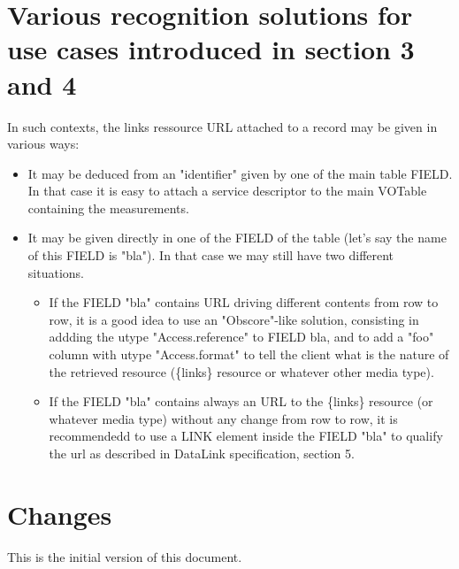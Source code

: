 \documentclass[11pt,a4paper]{ivoa}
\begin{document}
\section{Various recognition solutions for use cases introduced in section 3 and 4}
      In such contexts,  the links ressource URL attached to a record  may be given in various ways: 
\begin{itemize}
\item  It may be deduced from an "identifier" given by one of the main table FIELD. In that case it is easy to attach a service descriptor to the main VOTable containing the measurements. 
\item  It may be given directly in one of the FIELD of the table (let's say the name of this FIELD is "bla"). In that case we may still have two different situations. 
\begin{itemize}
\item If the FIELD "bla" contains URL driving different contents from row to row, it is a good idea to use an "Obscore"-like solution, consisting in addding the utype "Access.reference" to FIELD bla, and to add a "foo" column with utype "Access.format" to tell the client what is the nature of the retrieved resource (\{links\} resource or whatever other media type). 
\item  If the FIELD "bla" contains always an URL to the \{links\} resource (or whatever media type) without any change from row to row, it is recommendedd to use a LINK element inside the FIELD "bla" to qualify the url as described in DataLink specification, section 5. 
\end{itemize}
\end{itemize}





\section{Changes}

This is the initial version of this document.



\end{document}
